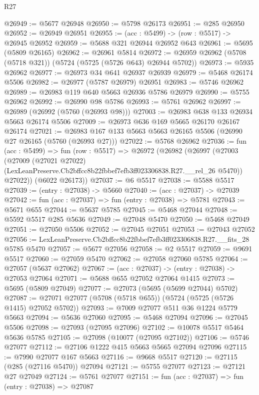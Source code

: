 \begin{lexlean}{R27}
\begin{coremodule}
@26949 := @5677 @26948
@26950 := @5798 @26173
@26951 := @285 @26950
@26952 := @26949 @26951
@26955 := (acc : @5499) -> (row : @5517) -> @26945 @26952
@26959 := @5688 @321 @26944 @26952 @643
@26961 := @5695 (@5809 @26165)
@26962 := @26961 @5814
@26972 := @26959 @26962 (@5708 (@5718 @321)) (@5724 (@5725 (@5726 @643) @26944 @5702))
@26973 := @5935 @26962
@26977 := @26973 @34 @641 @26937 @26939
@26979 := @5468 @26174 @5506
@26982 := @26977 (@5787 @26979) @26951
@26983 := @5746 @26962
@26989 := @26983 @119 @640 @5663 @26936 @5786 @26979
@26990 := @5755 @26962
@26992 := @26990 @98 @5786
@26993 := @5761 @26962
@26997 := @26989 (@26992 (@5760 (@26993 @98)))
@27003 := @26983 @638 @133 @26934 @5663 @26174 @5506
@27009 := @26973 @636 @169 @5665 @26170 @26167 @26174
@27021 := @26983 @167 @133 @5663 @5663 @26165 @5506 (@26990 @27 @26165 (@5760 (@26993 @27)))
@27022 := @5768 @26962
@27036 := fun (acc : @5499) =>
  fun (row : @5517) =>
  @26972
    (@26982
      (@26997
        (@27003
          (@27009
            (@27021 @27022)
            (LexLeanPreserve.Cb2bffcc8b22fbbef7efb3ff023306838.R27.__rel_26 @5470))
          @27022))
      (@6022 @26173))
@27037 := @6 @5517
@27038 := @5588 @5517
@27039 := (entry : @27038) -> @5660
@27040 := (acc : @27037) -> @27039
@27042 := fun (acc : @27037) => fun (entry : @27038) => @5781
@27043 := @5671 @655
@27044 := @5637 @5785
@27045 := @5468 @27044
@27048 := @5592 @5517 @285 @5636
@27049 := @27048 @5470
@27050 := @5468 @27049
@27051 := @27050 @5506
@27052 := @27045 @27051
@27053 := @27043 @27052
@27056 := LexLeanPreserve.Cb2bffcc8b22fbbef7efb3ff023306838.R27.__fits_28 @5785 @5470
@27057 := @5677 @27056
@27058 := @2 @5517
@27059 := @9691 @5517
@27060 := @27059 @5470
@27062 := @27058 @27060 @5785
@27064 := @27057 (@5637 @27062)
@27067 := (acc : @27037) -> (entry : @27038) -> @27053 @27064
@27071 := @5688 @655 @27052 @27064 @1415
@27073 := @5695 (@5809 @27049)
@27077 := @27073 (@5695 (@5699 @27044) @5702)
@27087 := @27071 @27077 (@5708 (@5718 @655)) (@5724 (@5725 (@5726 @1415) @27052 @5702))
@27093 := @7009 @27077 @511 @36 @1224 @5779 @5663
@27094 := @5636 @27060
@27095 := @5468 @27094
@27096 := @27045 @5506
@27098 := @27093 (@27095 @27096)
@27102 := @10078 @5517 @5464 @5636 @5785
@27105 := @27098 (@10077 (@27095 @27102))
@27106 := @5746 @27077
@27112 := @27106 @1222 @415 @5663 @5665 @27094 @27096
@27115 := @7990 @27077 @167 @5663
@27116 := @9668 @5517
@27120 := @27115 (@285 (@27116 @5470)) @27094
@27121 := @5755 @27077
@27123 := @27121 @27 @27049
@27124 := @5761 @27077
@27151 := fun (acc : @27037) =>
  fun (entry : @27038) =>
  @27087

\end{coremodule}
\end{lexlean}
